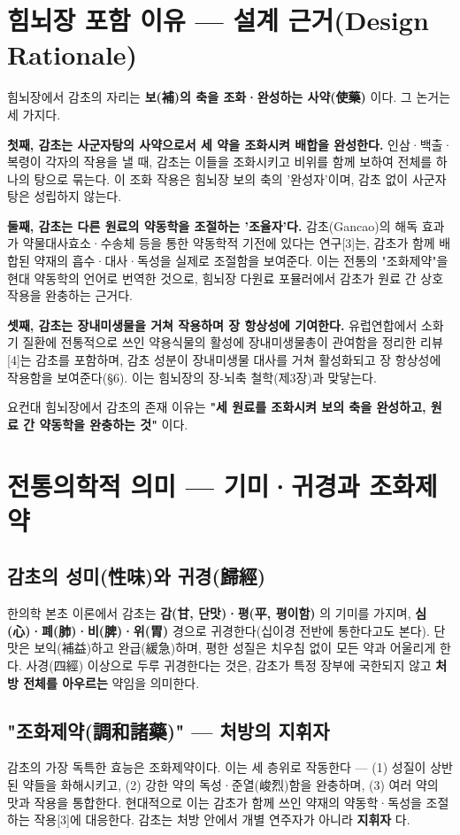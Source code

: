 \documentclass[11pt,oneside]{book}
\begin{document}
\section{힘뇌장 포함 이유 — 설계 근거(Design Rationale)}
힘뇌장에서 감초의 자리는 \textbf{보(補)의 축을 조화·완성하는 사약(使藥)} 이다. 그 논거는 세 가지다.

\textbf{첫째, 감초는 사군자탕의 사약으로서 세 약을 조화시켜 배합을 완성한다.} 인삼·백출·복령이 각자의 작용을 낼 때, 감초는 이들을 조화시키고 비위를 함께 보하여 전체를 하나의 탕으로 묶는다. 이 조화 작용은 힘뇌장 보의 축의 '완성자'이며, 감초 없이 사군자탕은 성립하지 않는다.

\textbf{둘째, 감초는 다른 원료의 약동학을 조절하는 '조율자'다.} 감초(Gancao)의 해독 효과가 약물대사효소·수송체 등을 통한 약동학적 기전에 있다는 연구[3]는, 감초가 함께 배합된 약재의 흡수·대사·독성을 실제로 조절함을 보여준다. 이는 전통의 "조화제약"을 현대 약동학의 언어로 번역한 것으로, 힘뇌장 다원료 포뮬러에서 감초가 원료 간 상호작용을 완충하는 근거다.

\textbf{셋째, 감초는 장내미생물을 거쳐 작용하며 장 항상성에 기여한다.} 유럽연합에서 소화기 질환에 전통적으로 쓰인 약용식물의 활성에 장내미생물총이 관여함을 정리한 리뷰[4]는 감초를 포함하며, 감초 성분이 장내미생물 대사를 거쳐 활성화되고 장 항상성에 작용함을 보여준다(§6). 이는 힘뇌장의 장-뇌축 철학(제3장)과 맞닿는다.

요컨대 힘뇌장에서 감초의 존재 이유는 \textbf{"세 원료를 조화시켜 보의 축을 완성하고, 원료 간 약동학을 완충하는 것"} 이다.

\section{전통의학적 의미 — 기미·귀경과 조화제약}
\subsection{감초의 성미(性味)와 귀경(歸經)}
한의학 본초 이론에서 감초는 \textbf{감(甘, 단맛)·평(平, 평이함)} 의 기미를 가지며, \textbf{심(心)·폐(肺)·비(脾)·위(胃)} 경으로 귀경한다(십이경 전반에 통한다고도 본다). 단맛은 보익(補益)하고 완급(緩急)하며, 평한 성질은 치우침 없이 모든 약과 어울리게 한다. 사경(四經) 이상으로 두루 귀경한다는 것은, 감초가 특정 장부에 국한되지 않고 \textbf{처방 전체를 아우르는} 약임을 의미한다.

\subsection{"조화제약(調和諸藥)" — 처방의 지휘자}
감초의 가장 독특한 효능은 조화제약이다. 이는 세 층위로 작동한다 — (1) 성질이 상반된 약들을 화해시키고, (2) 강한 약의 독성·준열(峻烈)함을 완충하며, (3) 여러 약의 맛과 작용을 통합한다. 현대적으로 이는 감초가 함께 쓰인 약재의 약동학·독성을 조절하는 작용[3]에 대응한다. 감초는 처방 안에서 개별 연주자가 아니라 \textbf{지휘자} 다.
\end{document}
